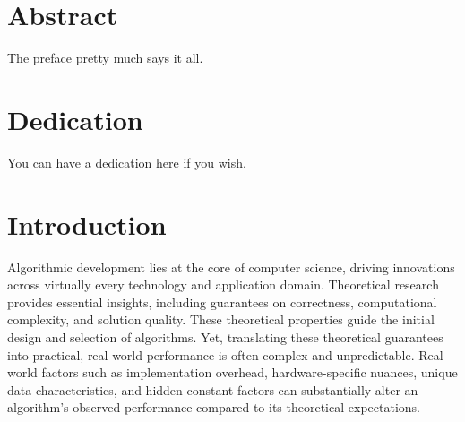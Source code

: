 \documentclass[12pt,twoside]{reedthesis}
\begin{document}
\tableofcontents
\listoftables
\listoffigures

\chapter*{Abstract}
The preface pretty much says it all.

\chapter*{Dedication}
You can have a dedication here if you wish.

\mainmatter %
\pagestyle{fancyplain} %


\chapter*{Introduction}

\onehalfspacing

Algorithmic development lies at the core of computer science, driving
innovations across virtually every technology and application domain.
Theoretical research provides essential insights, including
guarantees on correctness, computational complexity, and solution
quality. These theoretical properties guide the initial design and
selection of algorithms. Yet, translating these theoretical
guarantees into practical, real-world performance is often complex
and unpredictable. Real-world factors such as implementation
overhead, hardware-specific nuances, unique data characteristics, and
hidden constant factors can substantially alter an algorithm’s
observed performance compared to its theoretical expectations.
\end{document}
